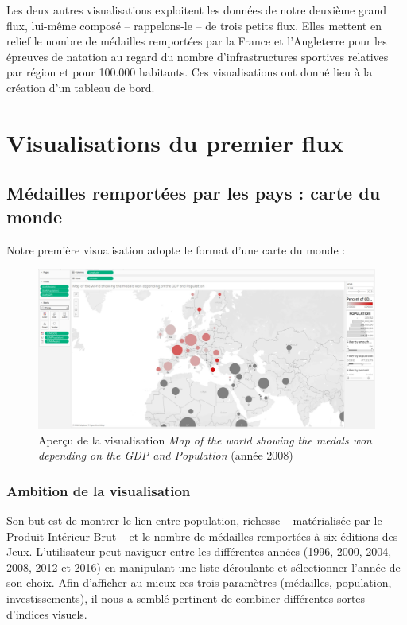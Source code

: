 \documentclass[hidelinks, 12pt]{report}
\begin{document}
Les deux autres visualisations exploitent les données de notre deuxième grand flux, lui-même composé -- rappelons-le -- de trois petits flux. Elles mettent en relief le nombre de médailles remportées par la France et l'Angleterre pour les épreuves de natation au regard du nombre d'infrastructures sportives relatives par région et pour 100.000 habitants. Ces visualisations ont donné lieu à la création d'un tableau de bord.

\section{Visualisations du premier flux}

\subsection{Médailles remportées par les pays : carte du monde}

\label{map}Notre première visualisation adopte le format d'une carte du monde :

\begin{center}
	\begin{figure}[H]
		\centering
		\setlength{\belowcaptionskip}{-35pt}
		\includegraphics[scale=0.25]{images/datavis-medals-world-map.jpeg}
		\captionsetup{justification=centering}
		\caption{Aperçu de la visualisation \textit{Map of the world showing the medals won depending on the GDP and Population} (année 2008)}
	\end{figure}
\end{center}

\subsubsection{Ambition de la visualisation}

Son but est de montrer le lien entre population, richesse -- matérialisée par le Produit Intérieur Brut -- et le nombre de médailles remportées à six éditions des Jeux. L'utilisateur peut naviguer entre les différentes années (1996, 2000, 2004, 2008, 2012 et 2016) en manipulant une liste déroulante et sélectionner l'année de son choix. Afin d'afficher au mieux ces trois paramètres (médailles, population, investissements), il nous a semblé pertinent de combiner différentes sortes d'indices visuels.
\end{document}
